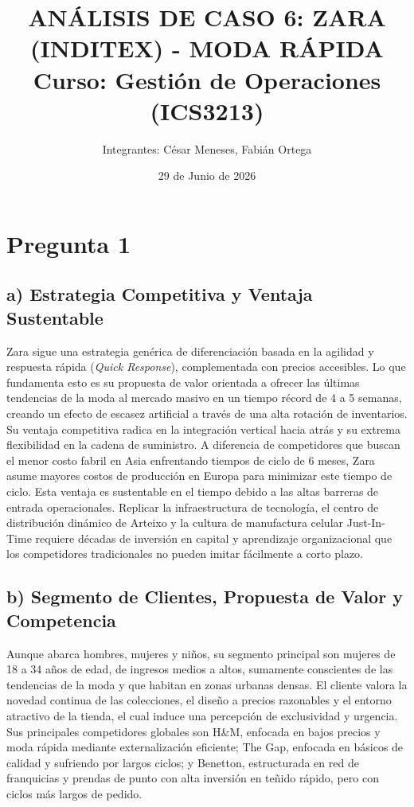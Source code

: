 \documentclass[11pt,a4paper]{article}
\title{\textbf{ANÁLISIS DE CASO 6: ZARA (INDITEX) - MODA RÁPIDA}\\ Curso: Gestión de Operaciones (ICS3213)}
\author{Integrantes: César Meneses, Fabián Ortega}
\date{29 de Junio de 2026}
\begin{document}
\maketitle

\section*{Pregunta 1}

\subsection*{a) Estrategia Competitiva y Ventaja Sustentable}
Zara sigue una estrategia genérica de diferenciación basada en la agilidad y respuesta rápida (\textit{Quick Response}), complementada con precios accesibles. Lo que fundamenta esto es su propuesta de valor orientada a ofrecer las últimas tendencias de la moda al mercado masivo en un tiempo récord de 4 a 5 semanas, creando un efecto de escasez artificial a través de una alta rotación de inventarios. 
Su ventaja competitiva radica en la integración vertical hacia atrás y su extrema flexibilidad en la cadena de suministro. A diferencia de competidores que buscan el menor costo fabril en Asia enfrentando tiempos de ciclo de 6 meses, Zara asume mayores costos de producción en Europa para minimizar este tiempo de ciclo. 
Esta ventaja es sustentable en el tiempo debido a las altas barreras de entrada operacionales. Replicar la infraestructura de tecnología, el centro de distribución dinámico de Arteixo y la cultura de manufactura celular Just-In-Time requiere décadas de inversión en capital y aprendizaje organizacional que los competidores tradicionales no pueden imitar fácilmente a corto plazo.

\subsection*{b) Segmento de Clientes, Propuesta de Valor y Competencia}
Aunque abarca hombres, mujeres y niños, su segmento principal son mujeres de 18 a 34 años de edad, de ingresos medios a altos, sumamente conscientes de las tendencias de la moda y que habitan en zonas urbanas densas. El cliente valora la novedad continua de las colecciones, el diseño a precios razonables y el entorno atractivo de la tienda, el cual induce una percepción de exclusividad y urgencia.
Sus principales competidores globales son H\&M, enfocada en bajos precios y moda rápida mediante externalización eficiente; The Gap, enfocada en básicos de calidad y sufriendo por largos ciclos; y Benetton, estructurada en red de franquicias y prendas de punto con alta inversión en teñido rápido, pero con ciclos más largos de pedido.
\end{document}
